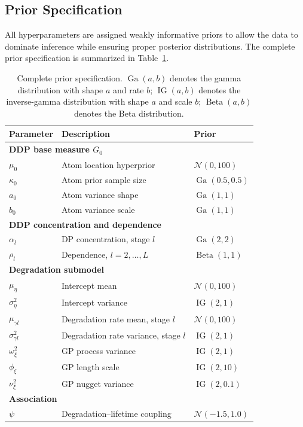 \documentclass[a4paper,fleqn,longmktitle]{cas-sc}
\DeclareMathOperator{\Ga}{Ga}
\DeclareMathOperator{\IG}{IG}
\DeclareMathOperator{\Be}{Beta}
\newcommand{\normal}{\mathcal{N}}
\begin{document}
\subsection{Prior Specification}
\label{sec:priors}

All hyperparameters are assigned weakly informative priors to allow the data to dominate inference while ensuring proper posterior distributions. The complete prior specification is summarized in Table~\ref{tab:priors}.

\begin{table}
\centering
\caption{Complete prior specification. $\Ga(a,b)$ denotes the gamma distribution with shape $a$ and rate $b$; $\IG(a,b)$ denotes the inverse-gamma distribution with shape $a$ and scale $b$; $\Be(a,b)$ denotes the Beta distribution.}
\label{tab:priors}
\begin{tabular}{lll}
\toprule
Parameter & Description & Prior \\
\midrule
\multicolumn{3}{l}{\textbf{DDP base measure $G_0$}} \\
$\mu_0$ & Atom location hyperprior & $\normal(0, 100)$ \\
$\kappa_0$ & Atom prior sample size & $\Ga(0.5, 0.5)$ \\
$a_0$ & Atom variance shape & $\Ga(1, 1)$ \\
$b_0$ & Atom variance scale & $\Ga(1, 1)$ \\
\midrule
\multicolumn{3}{l}{\textbf{DDP concentration and dependence}} \\
$\alpha_l$ & DP concentration, stage $l$ & $\Ga(2, 2)$ \\
$\rho_l$ & Dependence, $l = 2, \ldots, L$ & $\Be(1, 1)$ \\
\midrule
\multicolumn{3}{l}{\textbf{Degradation submodel}} \\
$\mu_\eta$ & Intercept mean & $\normal(0, 100)$ \\
$\sigma_\eta^2$ & Intercept variance & $\IG(2, 1)$ \\
$\mu_{\gamma l}$ & Degradation rate mean, stage $l$ & $\normal(0, 100)$ \\
$\sigma_{\gamma l}^2$ & Degradation rate variance, stage $l$ & $\IG(2, 1)$ \\
$\omega_\xi^2$ & GP process variance & $\IG(2, 1)$ \\
$\phi_\xi$ & GP length scale & $\IG(2, 10)$ \\
$\nu_\xi^2$ & GP nugget variance & $\IG(2, 0.1)$ \\
\midrule
\multicolumn{3}{l}{\textbf{Association}} \\
$\psi$ & Degradation--lifetime coupling & $\normal(-1.5, 1.0)$ \\
\bottomrule
\end{tabular}
\end{table}
\end{document}

